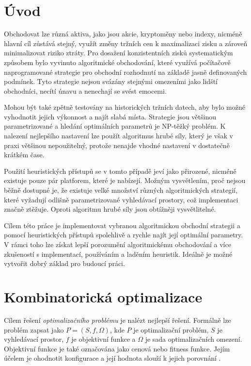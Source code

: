 \chapter*{Úvod}
\setcounter{page}{1}
Obchodovat lze různá aktiva, jako jsou akcie, kryptoměny nebo indexy, nicméně hlavní cíl zůstává stejný, využít změny tržních cen k maximalizaci zisku a zároveň minimalizovat riziko ztráty.
Pro dosažení konzistentních zisků systematickým způsobem bylo vyvinuto algoritmické obchodování, které využívá počítačově naprogramované strategie pro obchodní rozhodnutí na základě jasně definovaných podmínek.
Tyto strategie nejsou svázány stejnými omezeními jako lidští obchodníci, necítí únavu a nenechají se svést emocemi.

Mohou být také zpětně testovány na historických tržních datech, aby bylo možné vyhodnotit jejich výkonnost a najít slabá místa.
Strategie jsou většinou parametrizované a hledání optimálních parametrů je NP-těžký problém.
K nalezení nejlepšího nastavení lze použít algoritmus hrubé síly, který je však v praxi většinou nepoužitelný, protože nenajde vhodné nastavení v dostatečně krátkém čase.

Použití heuristických přístupů se v tomto případě jeví jako přirozené, nicméně existuje pouze pár platforem, které je nabízejí.
Možným vysvětlením, proč nejsou běžně dostupné je, že existuje velké množství různých algoritmických strategií, které vyžadují odlišně parametrizované vyhledávací prostory, což implementaci značně ztěžuje.
Oproti algoritmu hrubé síly jsou obtížněji vysvětlitelné.

Cílem této práce je implementovat vybranou algoritmickou obchodní strategii a pomocí heuristických přístupů spolehlivě a rychle najít její optimální parametry.
V rámci toho lze získat lepší porozumění algoritmickému obchodování a více zkušeností s implementací, používáním a laděním heuristik.
Ideálně je možné vytvořit dobrý základ pro budoucí práci.

\chapter{Kombinatorická optimalizace}
Cílem řešení \textit{optimalizačního problému} je nalézt nejlepší řešení.
Formálně lze problém zapsat jako $P=(S, f, \Omega)$, kde $P$ je optimalizační problém, $S$ je vyhledávací prostor, $f$ je objektivní funkce a $\Omega$ je sada optimalizačních omezení.
Objektivní funkce je také označována jako cenová nebo fitness funkce.
Jejím účelem je ohodnotit konfigurace a její hodnota slouží k jejich porovnání \cite{peres}.

